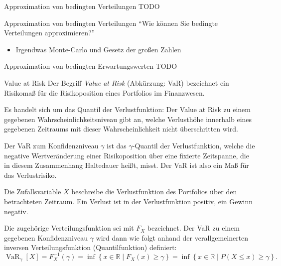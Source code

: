 \begin{defi}{Approximation von bedingten Verteilungen}
    TODO
\end{defi}

\begin{info}{Approximation von bedingten Verteilungen}
    \enquote{Wie können Sie bedingte Verteilungen approximieren?}
    \begin{itemize}
        \item Irgendwas Monte-Carlo und Gesetz der großen Zahlen
    \end{itemize}
\end{info}

\begin{defi}{Approximation von bedingten Erwartungswerten}
    TODO
\end{defi}

\begin{defi}{Value at Risk}
    Der Begriff \emph{Value at Risk} (Abkürzung: VaR) bezeichnet ein Risikomaß für die Risikoposition eines Portfolios im Finanzwesen.

    Es handelt sich um das Quantil der Verlustfunktion:
    Der Value at Risk zu einem gegebenen Wahrscheinlichkeitsniveau gibt an, welche Verlusthöhe innerhalb eines gegebenen Zeitraums mit dieser Wahrscheinlichkeit nicht überschritten wird.

    Der VaR zum Konfidenzniveau $\gamma$ ist das $\gamma$-Quantil der Verlustfunktion, welche die negative Wertveränderung einer Risikoposition über eine fixierte Zeitspanne, die in diesem Zusammenhang Haltedauer heißt, misst.
    Der VaR ist also ein Maß für das Verlustrisiko.

    Die Zufallsvariable $X$ beschreibe die Verlustfunktion des Portfolios über den betrachteten Zeitraum.
    Ein Verlust ist in der Verlustfunktion positiv, ein Gewinn negativ.

    Die zugehörige Verteilungsfunktion sei mit $F_{X}$ bezeichnet.
    Der VaR zu einem gegebenen Konfidenzniveau $\gamma$ wird dann wie folgt anhand der verallgemeinerten inversen Verteilungsfunktion (Quantilfunktion) definiert:
    \[
        \operatorname{VaR}_{\gamma}[X] = F_{X}^{-1}(\gamma) = \inf \left\{ x\in \mathbb {R} \mid F_{X}(x)\geq \gamma \right\} = \inf \left\{ x\in \mathbb {R} \mid P(X\leq x)\geq \gamma \right\}.
    \]
\end{defi}

